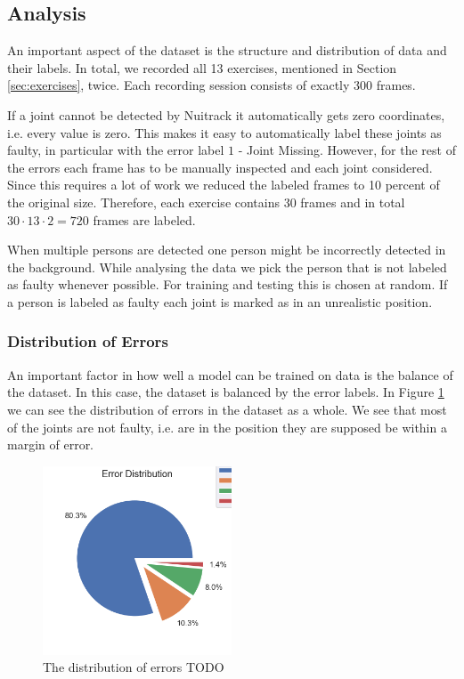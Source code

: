 \subsection{Analysis}

An important aspect of the dataset is the structure and distribution of data and their labels. In total, we recorded all 13 exercises, mentioned in Section \ref{sec:exercises}, twice. Each recording session consists of exactly 300 frames.

If a joint cannot be detected by Nuitrack it automatically gets zero coordinates, i.e. every value is zero. This makes it easy to automatically label these joints as faulty, in particular with the error label $1$ - Joint Missing. However, for the rest of the errors each frame has to be manually inspected and each joint considered. Since this requires a lot of work we reduced the labeled frames to 10 percent of the original size. Therefore, each exercise contains 30 frames and in total $30 \cdot 13 \cdot 2 = 720$ frames are labeled.

When multiple persons are detected one person might be incorrectly detected in the background. While analysing the data we pick the person that is not labeled as faulty whenever possible. For training and testing this is chosen at random. If a person is labeled as faulty each joint is marked as in an unrealistic position.

\subsubsection{Distribution of Errors}

An important factor in how well a model can be trained on data is the balance of the dataset. In this case, the dataset is balanced by the error labels. In Figure \ref{fig:statistics_err_dist} we can see the distribution of errors in the dataset as a whole. We see that most of the joints are not faulty, i.e. are in the position they are supposed be within a margin of error.

\begin{figure}
  \centering
  \includegraphics[width=0.5\textwidth]{figures/Data/Error_Distribution.png}
  \caption[Error Distribution]{The distribution of errors TODO}
  \label{fig:statistics_err_dist}
\end{figure}

